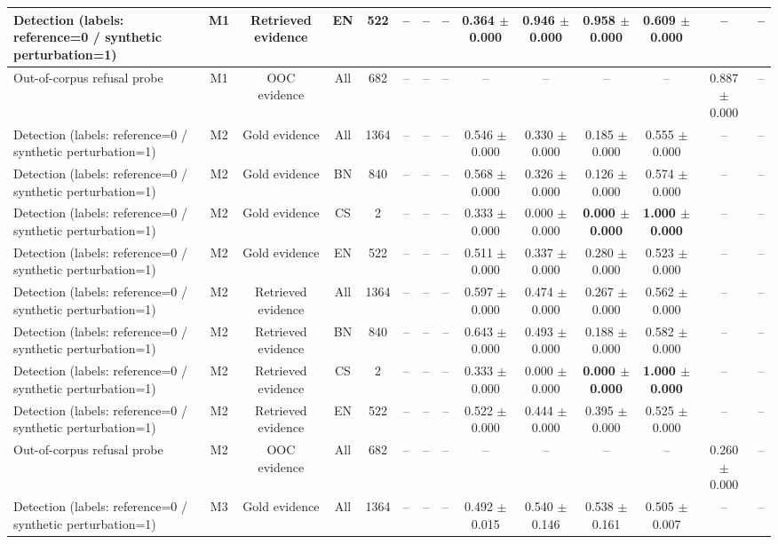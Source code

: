 \begin{table}[t]
{\begin{tabular}{lccccccccccccc}
Detection (labels: reference=0 / synthetic perturbation=1) & M1 & Retrieved evidence & EN & 522 & -- & -- & -- & 0.364 $\pm$ 0.000 & 0.946 $\pm$ 0.000 & 0.958 $\pm$ 0.000 & 0.609 $\pm$ 0.000 & -- & -- \\
\midrule
Out-of-corpus refusal probe & M1 & OOC evidence & All & 682 & -- & -- & -- & -- & -- & -- & -- & 0.887 $\pm$ 0.000 & -- \\
\midrule
Detection (labels: reference=0 / synthetic perturbation=1) & M2 & Gold evidence & All & 1364 & -- & -- & -- & 0.546 $\pm$ 0.000 & 0.330 $\pm$ 0.000 & 0.185 $\pm$ 0.000 & 0.555 $\pm$ 0.000 & -- & -- \\
Detection (labels: reference=0 / synthetic perturbation=1) & M2 & Gold evidence & BN & 840 & -- & -- & -- & 0.568 $\pm$ 0.000 & 0.326 $\pm$ 0.000 & 0.126 $\pm$ 0.000 & 0.574 $\pm$ 0.000 & -- & -- \\
Detection (labels: reference=0 / synthetic perturbation=1) & M2 & Gold evidence & CS & 2 & -- & -- & -- & 0.333 $\pm$ 0.000 & 0.000 $\pm$ 0.000 & \textbf{0.000 $\pm$ 0.000} & \textbf{1.000 $\pm$ 0.000} & -- & -- \\
Detection (labels: reference=0 / synthetic perturbation=1) & M2 & Gold evidence & EN & 522 & -- & -- & -- & 0.511 $\pm$ 0.000 & 0.337 $\pm$ 0.000 & 0.280 $\pm$ 0.000 & 0.523 $\pm$ 0.000 & -- & -- \\
Detection (labels: reference=0 / synthetic perturbation=1) & M2 & Retrieved evidence & All & 1364 & -- & -- & -- & 0.597 $\pm$ 0.000 & 0.474 $\pm$ 0.000 & 0.267 $\pm$ 0.000 & 0.562 $\pm$ 0.000 & -- & -- \\
Detection (labels: reference=0 / synthetic perturbation=1) & M2 & Retrieved evidence & BN & 840 & -- & -- & -- & 0.643 $\pm$ 0.000 & 0.493 $\pm$ 0.000 & 0.188 $\pm$ 0.000 & 0.582 $\pm$ 0.000 & -- & -- \\
Detection (labels: reference=0 / synthetic perturbation=1) & M2 & Retrieved evidence & CS & 2 & -- & -- & -- & 0.333 $\pm$ 0.000 & 0.000 $\pm$ 0.000 & \textbf{0.000 $\pm$ 0.000} & \textbf{1.000 $\pm$ 0.000} & -- & -- \\
Detection (labels: reference=0 / synthetic perturbation=1) & M2 & Retrieved evidence & EN & 522 & -- & -- & -- & 0.522 $\pm$ 0.000 & 0.444 $\pm$ 0.000 & 0.395 $\pm$ 0.000 & 0.525 $\pm$ 0.000 & -- & -- \\
\midrule
Out-of-corpus refusal probe & M2 & OOC evidence & All & 682 & -- & -- & -- & -- & -- & -- & -- & 0.260 $\pm$ 0.000 & -- \\
\midrule
Detection (labels: reference=0 / synthetic perturbation=1) & M3 & Gold evidence & All & 1364 & -- & -- & -- & 0.492 $\pm$ 0.015 & 0.540 $\pm$ 0.146 & 0.538 $\pm$ 0.161 & 0.505 $\pm$ 0.007 & -- & -- \\

\end{tabular}}
\end{table}
